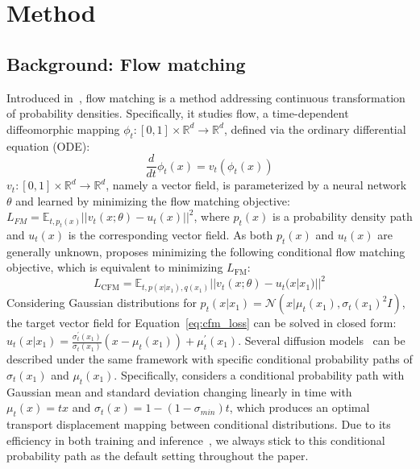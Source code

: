 \section{Method}
\label{sec:method}

\subsection{Background: Flow matching}
Introduced in~\cite{Lipman2022FlowMF}, flow matching is a method addressing continuous transformation of probability densities. Specifically, it studies flow, a time-dependent diffeomorphic mapping $\phi_t: [0,1]\times\mathbb{R}^d\rightarrow\mathbb{R}^d$, defined via the ordinary differential equation (ODE):
\begin{equation}\label{eq:ode}
    \frac{d}{dt}\phi_t(x)=v_t(\phi_t(x))
\end{equation}
$v_t:[0,1]\times\mathbb{R}^d\rightarrow\mathbb{R}^d$, namely a vector field, is parameterized by a neural network $\theta$ and learned by minimizing the flow matching objective: $L_{FM}=\mathbb{E}_{t,p_t(x)}||v_t(x;\theta)-u_t(x)||^2$, where $p_t(x)$ is a probability density path and $u_t(x)$ is the corresponding vector field. As both $p_t(x)$ and $u_t(x)$ are generally unknown, \citet{Lipman2022FlowMF} proposes minimizing the following conditional flow matching objective, which is equivalent to minimizing $L_{\text{FM}}$:
\begin{equation}\label{eq:cfm_loss}
L_{\text{CFM}}=\mathbb{E}_{t,p(x|x_1),q(x_1)}||v_t(x;\theta)-u_t(x|x_1)||^2
\end{equation}
 Considering Gaussian distributions for $p_t(x|x_1)=\mathcal{N}(x|\mu_t(x_1),\sigma_t(x_1)^2I)$, the target vector field for Equation~\ref{eq:cfm_loss} can be solved in closed form: $u_t(x|x_1)=\frac{\sigma^\prime_t(x_1)}{\sigma_t(x_1)}(x-\mu_t(x_1))+\mu^\prime_t(x_1)$. Several diffusion models~\cite{Dickstein2015deep,Ho2020Denoising,song2021scorebased} can be described under the same framework with specific conditional probability paths of $\sigma_t(x_1)$ and $\mu_t(x_1)$. Specifically, \citet{Lipman2022FlowMF} considers a conditional probability path with Gaussian mean and standard deviation changing linearly in time with $\mu_t(x)=tx$ and $\sigma_t(x)=1-(1-\sigma_{min})t$, which produces an optimal transport displacement mapping between conditional distributions. Due to its efficiency in both training and inference~\cite{Lipman2022FlowMF,Le2023VoiceboxTM}, we always stick to this conditional probability path as the default setting throughout the paper. 

